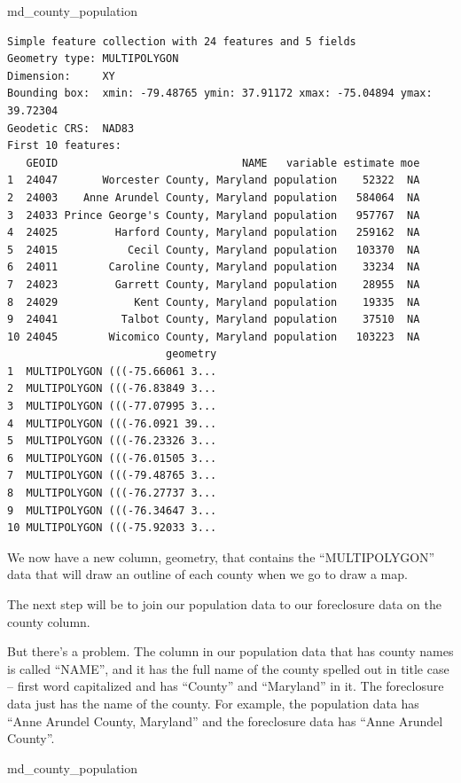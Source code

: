 \documentclass[
  letterpaper,
  DIV=11,
  numbers=noendperiod]{scrreprt}
\newenvironment{Shaded}{\begin{snugshade}}{\end{snugshade}}
\newcommand{\NormalTok}[1]{\textcolor[rgb]{0.00,0.23,0.31}{#1}}
\begin{document}
\begin{Shaded}
\begin{Highlighting}[]
\NormalTok{md\_county\_population}
\end{Highlighting}
\end{Shaded}

\begin{verbatim}
Simple feature collection with 24 features and 5 fields
Geometry type: MULTIPOLYGON
Dimension:     XY
Bounding box:  xmin: -79.48765 ymin: 37.91172 xmax: -75.04894 ymax: 39.72304
Geodetic CRS:  NAD83
First 10 features:
   GEOID                             NAME   variable estimate moe
1  24047       Worcester County, Maryland population    52322  NA
2  24003    Anne Arundel County, Maryland population   584064  NA
3  24033 Prince George's County, Maryland population   957767  NA
4  24025         Harford County, Maryland population   259162  NA
5  24015           Cecil County, Maryland population   103370  NA
6  24011        Caroline County, Maryland population    33234  NA
7  24023         Garrett County, Maryland population    28955  NA
8  24029            Kent County, Maryland population    19335  NA
9  24041          Talbot County, Maryland population    37510  NA
10 24045        Wicomico County, Maryland population   103223  NA
                         geometry
1  MULTIPOLYGON (((-75.66061 3...
2  MULTIPOLYGON (((-76.83849 3...
3  MULTIPOLYGON (((-77.07995 3...
4  MULTIPOLYGON (((-76.0921 39...
5  MULTIPOLYGON (((-76.23326 3...
6  MULTIPOLYGON (((-76.01505 3...
7  MULTIPOLYGON (((-79.48765 3...
8  MULTIPOLYGON (((-76.27737 3...
9  MULTIPOLYGON (((-76.34647 3...
10 MULTIPOLYGON (((-75.92033 3...
\end{verbatim}

We now have a new column, geometry, that contains the ``MULTIPOLYGON''
data that will draw an outline of each county when we go to draw a map.

The next step will be to join our population data to our foreclosure
data on the county column.

But there's a problem. The column in our population data that has county
names is called ``NAME'', and it has the full name of the county spelled
out in title case -- first word capitalized and has ``County'' and
``Maryland'' in it. The foreclosure data just has the name of the
county. For example, the population data has ``Anne Arundel County,
Maryland'' and the foreclosure data has ``Anne Arundel County''.

\begin{Shaded}
\begin{Highlighting}[]
\NormalTok{md\_county\_population}
\end{Highlighting}
\end{Shaded}
\end{document}
